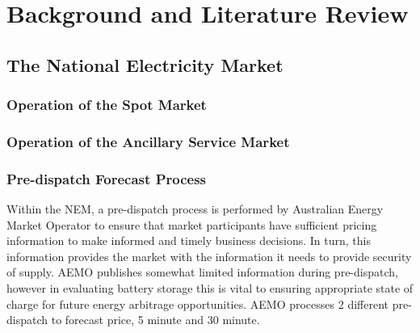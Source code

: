 \chapter{Background and Literature Review}
\section{ The National Electricity Market }
\subsection{ Operation of the Spot Market }
\subsection{ Operation of the Ancillary Service Market }
\subsection{ Pre-dispatch Forecast Process }
Within the NEM, a pre-dispatch process is performed by Australian Energy Market Operator to ensure that market participants have sufficient pricing information to make informed and timely business decisions. In turn, this information provides the market with the information it needs to provide security of supply.  AEMO publishes somewhat limited information during pre-dispatch, however in evaluating battery storage this is vital to ensuring appropriate state of charge for future energy arbitrage opportunities. AEMO processes 2 different pre-dispatch to forecast price, 5 minute and 30 minute.
